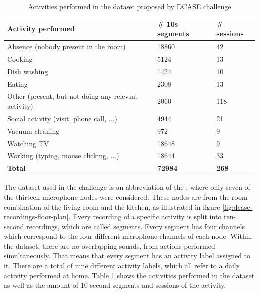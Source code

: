 \begin{table}[htbp]
    \centering
    \caption[Activities performed in the dataset proposed by DCASE challenge]{Activities performed in the dataset proposed by DCASE challenge\footnotemark}
	\label{tab:DCASE-activiies-performed}
    \begin{tabular}{l|l|l}
        \toprule
        \textbf{Activity performed} & \textbf{\# 10s segments} & \textbf{\# sessions} \\ 
        \midrule[1pt]
        Absence (nobody present in the room) & 18860 & 42 \\
        \hline
        Cooking & 5124 & 13 \\ 
        \hline
        Dish washing & 1424 & 10 \\ 
        \hline
        Eating & 2308 & 13 \\ 
        \hline
        Other (present, but not doing any relevant activity) & 2060 & 118 \\ 
        \hline
        Social activity (visit, phone call, ...) & 4944 & 21 \\ 
        \hline
        Vacuum cleaning & 972 & 9 \\ 
        \hline
        Watching TV & 18648 & 9 \\ 
        \hline
        Working (typing, mouse clicking, ...) & 18644 & 33 \\ 
        \midrule[1pt]
        \textbf{Total} & \textbf{72984} & \textbf{268} \\
        \bottomrule
    \end{tabular}
\end{table}
\noindent
The dataset used in the challenge is an abbreviation of the ; where only seven of the thirteen microphone nodes were considered. These nodes are from the room combination of the living room and the kitchen, as illustrated in figure \ref{fig:dcase-recordings-floor-plan}. Every recording of a specific activity is split into ten-second recordings, which are called segments. Every segment has four channels which correspond to the four different microphone channels of each node. Within the dataset, there are no overlapping sounds, from actions performed simultaneously. That means that every segment has an activity label assigned to it. There are a total of nine different activity labels, which all refer to a daily activity performed at home. Table \ref{tab:DCASE-activiies-performed} shows the activities performed in the dataset as well as the amount of 10-second segments and sessions of the activity.
